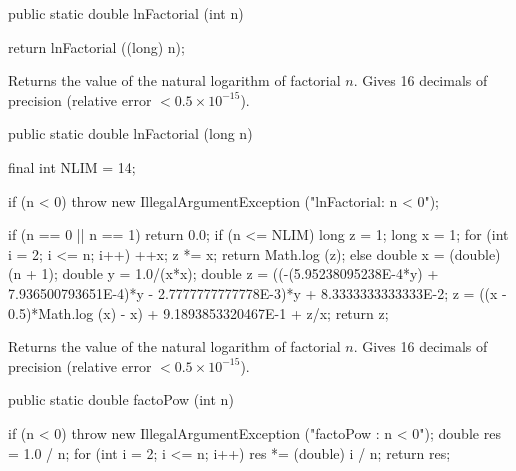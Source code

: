 \begin{code}

   public static double lnFactorial (int n)\begin{hide} {
      return lnFactorial ((long) n);
   }\end{hide}
\end{code}
 \begin{tabb} Returns the value of the natural logarithm of
  factorial $n$. Gives 16 decimals of precision
  (relative error $< 0.5\times 10^{-15}$).
 \end{tabb}
 \begin{htmlonly}
 \end{htmlonly}
\begin{code}

   public static double lnFactorial (long n)\begin{hide} {
      final int NLIM = 14;

      if (n < 0)
        throw new IllegalArgumentException ("lnFactorial:   n < 0");

      if (n == 0 || n == 1)
         return 0.0;
      if (n <= NLIM) {
         long z = 1;
         long x = 1;
         for (int i = 2; i <= n; i++) {
            ++x;
            z *= x;
         }
         return Math.log (z);
      }
      else {
         double x = (double)(n + 1);
         double y = 1.0/(x*x);
         double z = ((-(5.95238095238E-4*y) + 7.936500793651E-4)*y -
            2.7777777777778E-3)*y + 8.3333333333333E-2;
         z = ((x - 0.5)*Math.log (x) - x) + 9.1893853320467E-1 + z/x;
         return z;
      }
   }\end{hide}
\end{code}
 \begin{tabb} Returns the value of the natural logarithm of
  factorial $n$. Gives 16 decimals of precision
  (relative error $< 0.5\times 10^{-15}$).
 \end{tabb}
 \begin{htmlonly}
 \end{htmlonly}
\begin{code}

   public static double factoPow (int n)\begin{hide} {
      if (n < 0)
        throw new IllegalArgumentException ("factoPow :   n < 0");
      double res = 1.0 / n;
      for (int i = 2; i <= n; i++) {
         res *= (double) i / n;
      }
      return res;
    }\end{hide}
\end{code}
